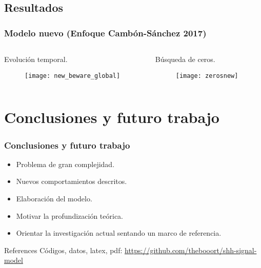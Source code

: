 \documentclass{beamer}
\begin{document}
\subsection{Resultados}

\begin{frame}
\frametitle{Modelo nuevo (Enfoque Cambón-Sánchez 2017)}
\begin{columns}
	\begin{column}{0.5\textwidth}
		Evolución temporal.
		\begin{figure}
			\texttt{[image: new\_beware\_global]}
		\end{figure}
	\end{column}
	\begin{column}{0.5\textwidth}
		Búsqueda de ceros.
		\begin{figure}
			\texttt{[image: zerosnew]}
		\end{figure}
	\end{column}
\end{columns}
\end{frame}

\section{Conclusiones y futuro trabajo}

\begin{frame}
	\frametitle{Conclusiones y futuro trabajo}
	
	\begin{itemize}
		\item Problema de gran complejidad.
		\item Nuevos comportamientos descritos.
		\item Elaboración del modelo. 
		\item Motivar la profundización teórica.
		\item Orientar la investigación actual sentando un marco de referencia.
	\end{itemize}
\nocite{schaffer,cambon1, saha}
\end{frame}



\begin{frame}{References}
\small{Códigos, datos, latex, pdf: \url{https://github.com/thebooort/shh-signal-model}}


\end{frame}
\end{document}
